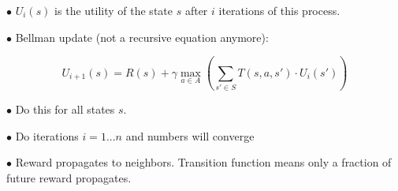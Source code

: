 \documentclass[english,openany]{book}
\begin{document}
    $\bullet$ $U_i (s)$ is the utility of the state $s$ after $i$ iterations of this process.
    
    $\bullet$ Bellman update (not a recursive equation anymore):
    
    $$ U_{i+1} (s) = R(s) + \gamma \max_{a \in A} (\sum_{s' \in S} T(s, a, s') \cdot U_i (s')) $$
    
    $\bullet$ Do this for all states $s$.
    
    $\bullet$ Do iterations $i = 1 ... n$ and numbers will converge
    
    $\bullet$ Reward propagates to neighbors. Transition function means only a fraction of future reward propagates.
    
\end{document}

